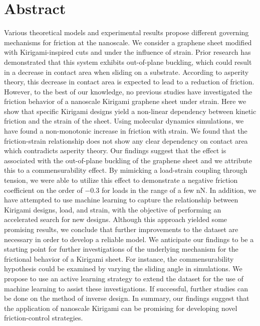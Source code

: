 \chapter*{Abstract} 
Various theoretical models and experimental results propose different governing
mechanisms for friction at the nanoscale. We consider a graphene sheet modified
with Kirigami-inspired cuts and under the influence of strain. Prior research
has demonstrated that this system exhibits out-of-plane buckling, which could
result in a decrease in contact area when sliding on a substrate. According to
asperity theory, this decrease in contact area is expected to lead to a
reduction of friction. However, to the best of our knowledge, no previous
studies have investigated the friction behavior of a nanoscale Kirigami graphene
sheet under strain. Here we show that specific Kirigami designs yield a
non-linear dependency between kinetic friction and the strain of the sheet.
Using molecular dynamics simulations, we have found a non-monotonic increase in
friction with strain. We found that the friction-strain relationship does not
show any clear dependency on contact area which contradicts asperity theory. Our
findings suggest that the effect is associated with the out-of-plane buckling of
the graphene sheet and we attribute this to a commensurability effect. By
mimicking a load-strain coupling through tension, we were able to utilize this
effect to demonstrate a negative friction coefficient on the order of $-0.3$ for
loads in the range of a few nN. In addition, we have attempted to use machine
learning to capture the relationship between Kirigami designs, load, and strain,
with the objective of performing an accelerated search for new designs. Although this approach yielded some promising results, we conclude that further
improvements to the dataset are necessary in order to develop a reliable model. We anticipate our findings to be a starting point for further investigations of
the underlying mechanism for the frictional behavior of a Kirigami sheet. For
instance, the commensurability hypothesis could be examined by varying the
sliding angle in simulations. We propose to use an active learning strategy to
extend the dataset for the use of machine learning to assist these
investigations. If successful, further studies can be done on the method of
inverse design. In summary, our findings suggest that the application of
nanoscale Kirigami can be promising for developing novel friction-control
strategies.

